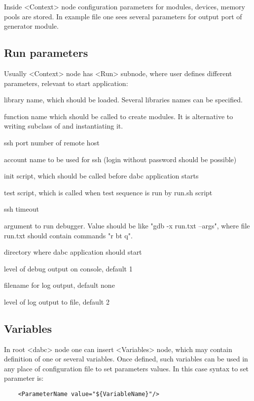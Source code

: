 Inside <Context> node configuration parameters for modules, devices, memory pools are stored.
In example file one sees several parameters for output port of generator module.  

\subsection{Run parameters}

Usually <Context> node has <Run> subnode, where user defines different parameters, relevant to start
application:

\bdes
\item[lib] library name, which should be loaded. Several libraries names can be specified.
\item[func] function name which should be called to create modules. 
It is alternative to writing subclass of  and instantiating it.
\item[port] ssh port number of remote host
\item[user] account name to be used for ssh (login without password should be possible)
\item[init] init script, which should be called before dabc application starts
\item[test] test script, which is called when test sequence is run by run.sh script
\item[timeout] ssh timeout 
\item[debugger] argument to run debugger. Value should be like "gdb -x run.txt --args", where file run.txt should contain commands "r bt q".
\item[workdir] directory where dabc application should start
\item[debuglevel] level of debug output on console, default 1
\item[logfile] filename for log output, default none  
\item[loglevel] level of log output to file, default 2 
\edes


\subsection{Variables}

In root <dabc> node one can insert <Variables> node, which may contain 
definition of one or several variables. Once defined, 
such variables can be used in any place of configuration file to set parameters values.
In this case syntax to set parameter is:

\begin{verbatim}
    <ParameterName value="${VariableName}"/>
\end{verbatim}

